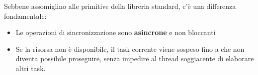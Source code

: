 Sebbene assomiglino alle primitive della libreria standard, c'è una differenza
fondamentale:

\begin{itemize}
  \item Le operazioni di sincronizzazione sono \textbf{asincrone} e non bloccanti
  \item Se la risorsa non è disponibile, il task corrente viene sospeso fino a che non diventa possibile
        proseguire, senza impedire al thread soggiacente di elaborare altri task.
\end{itemize}













